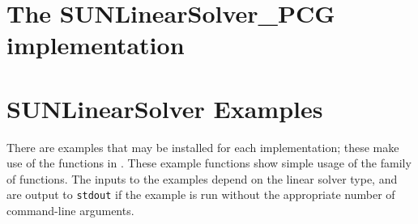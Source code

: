 \section{The SUNLinearSolver\_PCG implementation}\label{ss:sunlinsol_pcg}



\section{SUNLinearSolver Examples}\label{ss:sunlinsol_examples}

There are  examples that may be installed for each
implementation; these make use of the functions in . 
These example functions show simple usage of the  family
of functions.  The inputs to the examples depend on the linear solver type,
and are output to \texttt{stdout} if the example is run without the
appropriate number of command-line arguments. 

